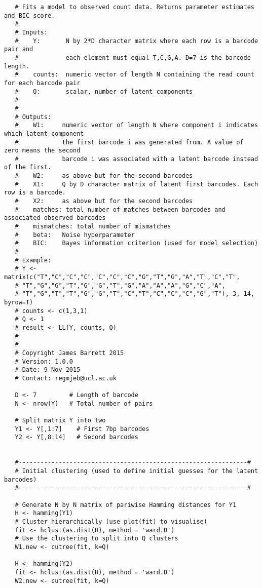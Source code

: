 \begin{footnotesize}
\begin{lstlisting}
   # Fits a model to observed count data. Returns parameter estimates and BIC score.
   #
   # Inputs:
   #    Y:       N by 2*D character matrix where each row is a barcode pair and 
   #             each element must equal T,C,G,A. D=7 is the barcode length.
   #    counts:  numeric vector of length N containing the read count for each barcode pair
   #    Q:       scalar, number of latent components
   #    
   #
   # Outputs:
   #    W1:     numeric vector of length N where component i indicates which latent component
   #            the first barcode i was generated from. A value of zero means the second
   #            barcode i was associated with a latent barcode instead of the first.
   #    W2:     as above but for the second barcodes
   #    X1:     Q by D character matrix of latent first barcodes. Each row is a barcode. 
   #    X2:     as above but for the second barcodes
   #    matches: total number of matches between barcodes and associated observed barcodes 
   #    mismatches: total number of mismatches
   #    beta:   Noise hyperparameter
   #    BIC:    Bayes information criterion (used for model selection)
   #
   # Example:
   # Y <-  matrix(c("T","C","C","C","C","C","C","G","T","G","A","T","C","T",
   # "T","G","G","T","G","G","T","G","A","A","A","G","C","A",
   # "T","G","T","T","G","G","T","C","T","C","C","C","G","T"), 3, 14, byrow=T) 
   # counts <- c(1,3,1)
   # Q <- 1
   # result <- LL(Y, counts, Q)
   #
   #
   # Copyright James Barrett 2015
   # Version: 1.0.0
   # Date: 9 Nov 2015
   # Contact: regmjeb@ucl.ac.uk
   
   D <- 7         # Length of barcode
   N <- nrow(Y)   # Total number of pairs
   
   # Split matrix Y into two
   Y1 <- Y[,1:7]    # First 7bp barcodes
   Y2 <- Y[,8:14]   # Second barcodes
   
   
   #---------------------------------------------------------------#
   # Initial clustering (used to define initial guesses for the latent barcodes)
   #---------------------------------------------------------------#
   
   # Generate N by N matrix of pariwise Hamming distances for Y1
   H <- hamming(Y1)
   # Cluster hierarchically (use plot(fit) to visualise)
   fit <- hclust(as.dist(H), method = 'ward.D')
   # Use the clustering to split into Q clusters
   W1.new <- cutree(fit, k=Q)
   
   H <- hamming(Y2)
   fit <- hclust(as.dist(H), method = 'ward.D')
   W2.new <- cutree(fit, k=Q)
   

\end{lstlisting}
\end{footnotesize}
